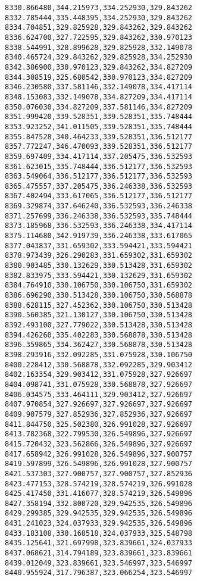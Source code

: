 \documentclass[11pt]{article}
\begin{document}
\begin{Verbatim}[commandchars=\\\{\}]
8330.866480,344.215973,334.252930,329.843262
8332.785444,335.448395,334.252930,329.843262
8334.704851,329.825928,329.843262,329.843262
8336.624700,327.722595,329.843262,330.970123
8338.544991,328.899628,329.825928,332.149078
8340.465724,329.843262,329.825928,334.252930
8342.386900,330.970123,329.843262,334.827209
8344.308519,325.680542,330.970123,334.827209
8346.230580,337.581146,332.149078,334.417114
8348.153083,332.149078,334.827209,334.417114
8350.076030,334.827209,337.581146,334.827209
8351.999420,339.528351,339.528351,335.748444
8353.923252,341.011505,339.528351,335.748444
8355.847528,340.464233,339.528351,336.512177
8357.772247,346.470093,339.528351,336.512177
8359.697409,334.417114,337.205475,336.532593
8361.623015,335.748444,336.512177,336.532593
8363.549064,336.512177,336.512177,336.532593
8365.475557,337.205475,336.246338,336.532593
8367.402494,333.617065,336.512177,336.512177
8369.329874,337.646240,336.532593,336.246338
8371.257699,336.246338,336.532593,335.748444
8373.185968,336.532593,336.246338,334.417114
8375.114680,342.919739,336.246338,333.617065
8377.043837,331.659302,333.594421,333.594421
8378.973439,326.290283,331.659302,331.659302
8380.903485,330.132629,330.513428,331.659302
8382.833975,333.594421,330.132629,331.659302
8384.764910,330.106750,330.106750,331.659302
8386.696290,330.513428,330.106750,330.568878
8388.628115,327.452362,330.106750,330.513428
8390.560385,321.130127,330.106750,330.513428
8392.493100,327.779022,330.513428,330.513428
8394.426260,335.402283,330.568878,330.513428
8396.359865,334.362427,330.568878,330.513428
8398.293916,332.092285,331.075928,330.106750
8400.228412,330.568878,332.092285,329.903412
8402.163354,329.903412,331.075928,327.926697
8404.098741,331.075928,330.568878,327.926697
8406.034575,333.464111,329.903412,327.926697
8407.970854,327.926697,327.926697,327.926697
8409.907579,327.852936,327.852936,327.926697
8411.844750,325.502380,326.991028,327.926697
8413.782368,322.799530,326.549896,327.926697
8415.720432,323.562866,326.549896,327.926697
8417.658942,326.991028,326.549896,327.900757
8419.597899,326.549896,326.991028,327.900757
8421.537303,327.900757,327.900757,327.852936
8423.477153,328.574219,328.574219,326.991028
8425.417450,331.416077,328.574219,326.549896
8427.358194,332.800720,329.942535,326.549896
8429.299385,329.942535,329.942535,326.549896
8431.241023,324.037933,329.942535,326.549896
8433.183108,330.168518,324.037933,325.548798
8435.125641,321.697998,323.839661,324.037933
8437.068621,314.794189,323.839661,323.839661
8439.012049,323.839661,323.546997,323.546997
8440.955924,317.796387,323.066254,323.546997

\end{Verbatim}
\end{document}
